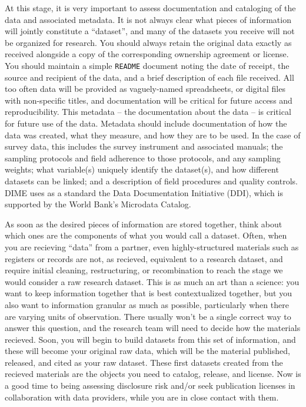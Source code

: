 At this stage, it is very important to assess
documentation and cataloging of the data and associated metadata.
It is not always clear what pieces of information will jointly constitute a ``dataset'',
and many of the datasets you receive will not be organized for research.
You should always retain the original data exactly as received
alongside a copy of the corresponding ownership agreement or license.
You should maintain a simple \texttt{README} document noting the date of receipt,
the source and recipient of the data,
and a brief description of each file received.
All too often data will be provided as vaguely-named spreadsheets,
or digital files with non-specific titles,
and documentation will be critical for future access and reproducibility.
This metadata -- the documentation about the data -- is critical for future use of the data.
Metadata should include documentation of how the data was created,
what they measure, and how they are to be used.
In the case of survey data, this includes the survey instrument and associated manuals;
the sampling protocols and field adherence to those protocols, and any sampling weights;
what variable(s) uniquely identify the dataset(s), and how different datasets can be linked;
and a description of field procedures and quality controls.
DIME uses as a standard the Data Documentation Initiative (DDI), which is supported by the
World Bank's Microdata Catalog.

As soon as the desired pieces of information are stored together,
think about which ones are the components of what you would call a dataset.
Often, when you are recieving ``data'' from a partner,
even highly-structured materials such as registers or records
are not, as recieved, equivalent to a research dataset,
and require initial cleaning, restructuring, or recombination
to reach the stage we would consider a raw research dataset.
This is as much an art than a science:
you want to keep information together that is best contextualized together,
but you also want to information granular as much as possible,
particularly when there are varying units of observation.
There usually won't be a single correct way to answer this question,
and the research team will need to decide how the materials recieved.
Soon, you will begin to build datasets from this set of information,
and these will become your original raw data,
which will be the material published, released, and cited as your raw dataset.
These first datasets created from the recieved materials
are the objects you need to catalog, release, and license.
Now is a good time to being assessing disclosure risk
and/or seek publication licenses in collaboration with data providers,
while you are in close contact with them.

